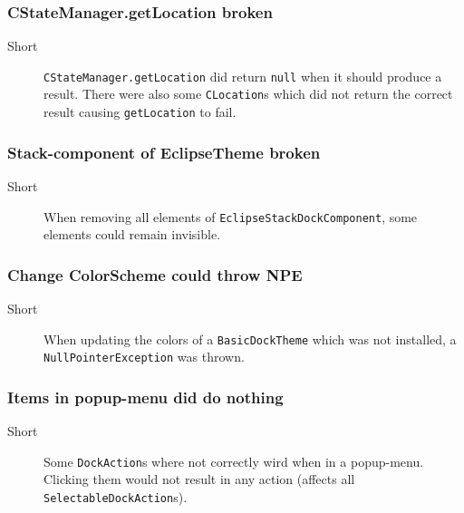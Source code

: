 \documentclass[a4paper,10pt]{article}
\newcommand{\src}[1]{\lstinline[basicstyle=\normalsize\ttfamily,keywordstyle=\normalsize\ttfamily,identifierstyle=\normalsize\ttfamily]|#1|}
\newcommand{\short}{\item[Short]}
\begin{document}
\subsubsection{CStateManager.getLocation broken}
\begin{description}
 \short \src{CStateManager.getLocation} did return \src{null} when it should produce a result. There were also some \src{CLocation}s which did not return the correct result causing \src{getLocation} to fail.
\end{description}

\subsubsection{Stack-component of EclipseTheme broken}
\begin{description}
 \short When removing all elements of \src{EclipseStackDockComponent}, some elements could remain invisible.
\end{description}

\subsubsection{Change ColorScheme could throw NPE}
\begin{description}
 \short When updating the colors of a \src{BasicDockTheme} which was not installed, a \src{NullPointerException} was thrown.
\end{description}

\subsubsection{Items in popup-menu did do nothing}
\begin{description}
 \short Some \src{DockAction}s where not correctly wird when in a popup-menu. Clicking them would not result in any action (affects all \\\src{SelectableDockAction}s).
\end{description}
\end{document}
